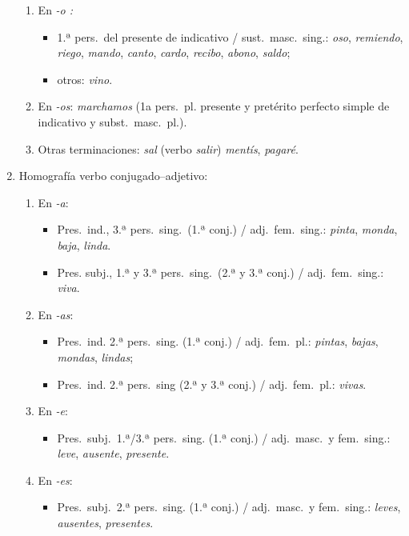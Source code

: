 \begin{enumerate}
\begin{enumerate}
\item En \emph{-o :} \begin{itemize} \item 1.ª pers.\ del presente de indicativo / sust.\ masc.\ sing.: \emph{oso}, \emph{remiendo}, \emph{riego}, \emph{mando}, \emph{canto}, \emph{cardo}, \emph{recibo}, \emph{abono}, \emph{saldo}; \item otros: \emph{vino}. \end{itemize} 

\item En \emph{-os}: \emph{marchamos} (1a pers.\ pl. presente y pretérito perfecto simple de indicativo y subst.\ masc.\ pl.). 

\item Otras terminaciones: \emph{sal} (verbo \emph{salir}) \emph{mentís}, \emph{pagaré}. 

\end{enumerate} \item Homografía verbo conjugado--adjetivo: \begin{enumerate} 

\item En \emph{-a}: \begin{itemize} \item Pres.\ ind., 3.ª pers.\  sing.\ (1.ª conj.) / adj.\ fem.\ sing.: {\em pinta}, \emph{monda}, \emph{ baja}, \emph{linda}. \item Pres. subj., 1.ª y 3.ª pers.\ sing.\ (2.ª y 3.ª conj.) / adj.\ fem.\ sing.: \emph{viva}. \end{itemize} 

\item En \emph{-as}: \begin{itemize} \item Pres.\ ind. 2.ª pers.\ sing. (1.ª conj.) / adj.\ fem.\ pl.: \emph{pintas}, \emph{bajas}, \emph{mondas}, \emph{lindas}; \item Pres.\ ind. 2.ª pers.\ sing (2.ª y 3.ª conj.) / adj.\ fem.\ pl.: \emph{vivas}. \end{itemize} 

\item En \emph{-e}: \begin{itemize} \item Pres.\ subj.\ 1.ª/3.ª pers.\ sing. (1.ª conj.) / adj.\ masc.\ y fem.\ sing.: \emph{leve}, \emph{ausente}, \emph{presente}. \end{itemize} 

\item En \emph{-es}: \begin{itemize} \item Pres.\ subj.\ 2.ª pers.\ sing. (1.ª conj.) / adj.\ masc.\ y fem.\ sing.: \emph{leves}, \emph{ausentes}, \emph{presentes}. \end{itemize} 


\end{enumerate}
\end{enumerate}
